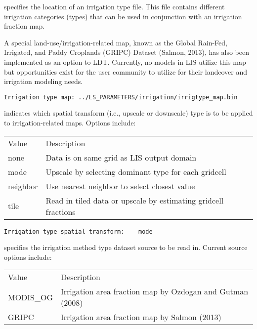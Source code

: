  
  specifies the location of an irrigation
 type file.
 This file contains different irrigation categories (types) that
 can be used in conjunction with an irrigation fraction map.
 
 A special land-use/irrigation-related map, known as the
 Global Rain-Fed, Irrigated, and Paddy Croplands (GRIPC) Dataset
 (Salmon, 2013), has also been implemented as an option to
 LDT.  Currently, no models in LIS utilize this map but 
 opportunities exist for the user community to utilize for their
 landcover and irrigation modeling needs.
 

 \begin{Verbatim}[frame=single]
Irrigation type map: ../LS_PARAMETERS/irrigation/irrigtype_map.bin
 \end{Verbatim}

 
  indicates which spatial transform
 (i.e., upscale or downscale) type is to be applied to
 irrigation-related maps.  Options include:

 \begin{tabular}{ll}
 Value   & Description                                   \\
 none    & Data is on same grid as LIS output domain            \\
 mode    & Upscale by selecting dominant type for each gridcell \\
 neighbor &  Use nearest neighbor to select closest value  \\
 tile    & Read in tiled data or upscale by estimating gridcell fractions\\
 \end{tabular}
 

 \begin{Verbatim}[frame=single]
Irrigation type spatial transform:    mode
 \end{Verbatim}

 
  specifies the irrigation method type 
 dataset source to be read in.
 Current source options include:

 \begin{tabular}{ll}
 Value       & Description               \\
 MODIS\_OG   & Irrigation area fraction map by Ozdogan and Gutman (2008) \\
 GRIPC       & Irrigation area fraction map by Salmon (2013) \\
 \end{tabular}
 


